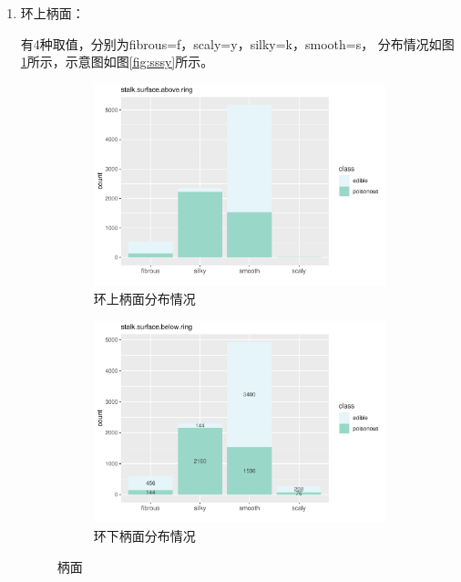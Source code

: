 \documentclass[lang=cn,11pt,a4paper,cite=super]{elegantpaper}
\begin{document}
\begin{enumerate}
   \item 环上柄面：\par 有4种取值，分别为fibrous=f，scaly=y，silky=k，smooth=s，
   分布情况如图\ref{fig:ssa}所示，示意图如图\ref{fig:sssy}所示。
   \begin{figure}[hbt]
      \begin{subfigure}[b]{0.49\textwidth}
        \centering
        \includegraphics[width=\linewidth]{img/stalksurfaceabovering-1.pdf}  
      \caption{环上柄面分布情况}
      \label{fig:ssa}
      \end{subfigure}
      \begin{subfigure}[b]{0.49\textwidth}
        \centering
        \includegraphics[width=\linewidth]{img/stalksurfacebelowring-1.pdf}  
        \caption{环下柄面分布情况}
        \label{fig:ssb}
      \end{subfigure}
      \caption{柄面}
   \end{figure}


\end{enumerate}
\end{document}
